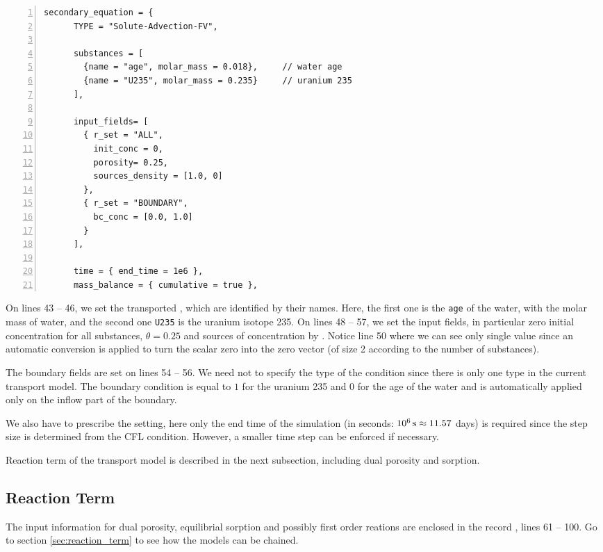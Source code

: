 \begin{Verbatim}[numbers=left, firstnumber=last]
    secondary_equation = {
      TYPE = "Solute-Advection-FV", 

      substances = [ 
        {name = "age", molar_mass = 0.018},     // water age
        {name = "U235", molar_mass = 0.235}     // uranium 235
      ],
      
      input_fields= [
        { r_set = "ALL",
          init_conc = 0,
          porosity= 0.25,
          sources_density = [1.0, 0]
        },
        { r_set = "BOUNDARY",
          bc_conc = [0.0, 1.0]
        }
      ],
      
      time = { end_time = 1e6 },
      mass_balance = { cumulative = true },
\end{Verbatim}

On lines 43 -- 46, we set the transported , 
which are identified by their names. Here, the first one is the \verb'age' of the water, with the molar mass of water, 
and the second one \verb'U235' is the uranium isotope 235. 
On lines 48 -- 57, we set the input fields, in particular zero initial concentration for all substances,
 $\theta = 0.25$ and 
sources of concentration by . 
Notice line 50 where we can see only single value since an automatic conversion is applied to turn the scalar 
zero into the zero vector (of size 2 according to the number of substances). 

The boundary fields are set on lines 54 -- 56. We need not to specify the type of the condition since there is 
only one type in the current transport model. The boundary condition is equal to $1$ for the uranium 235 and $0$ 
for the age of the water and is automatically applied only on the inflow part of the boundary. 

We also have to prescribe the  setting, here only the end time of the simulation
(in seconds: $10^6\,\rm{s}\approx 11.57$ days) is required since the step size is determined from the CFL condition. 
However, a smaller time step can be enforced if necessary.

Reaction term of the transport model is described in the next subsection, including dual porosity and sorption.

\subsection{Reaction Term}\label{subsubsec:reactions}
The input information for dual porosity, equilibrial sorption and possibly first order reations are enclosed in the record 
, lines 61 -- 100. Go to section \ref{sec:reaction_term}
to see how the models can be chained.

